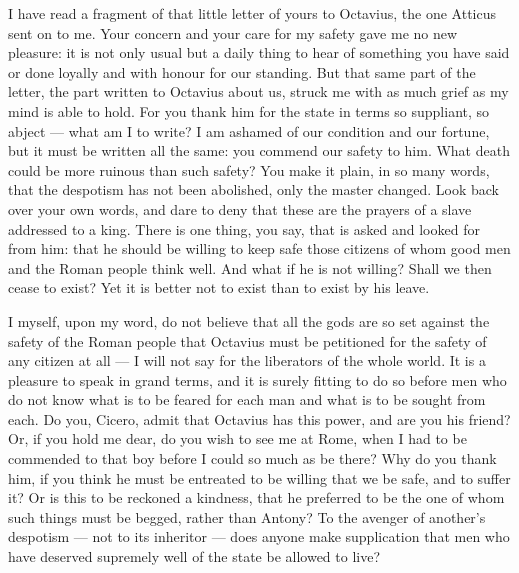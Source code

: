 

 I have read a fragment of that little letter of yours to Octavius, the one Atticus sent on to me. Your concern and your care for my safety gave me no new pleasure: it is not only usual but a daily thing to hear of something you have said or done loyally and with honour for our standing. But that same part of the letter, the part written to Octavius about us, struck me with as much grief as my mind is able to hold. For you thank him for the state in terms so suppliant, so abject --- what am I to write? I am ashamed of our condition and our fortune, but it must be written all the same: you commend our safety to him. What death could be more ruinous than such safety? You make it plain, in so many words, that the despotism has not been abolished, only the master changed. Look back over your own words, and dare to deny that these are the prayers of a slave addressed to a king. There is one thing, you say, that is asked and looked for from him: that he should be willing to keep safe those citizens of whom good men and the Roman people think well. And what if he is not willing? Shall we then cease to exist? Yet it is better not to exist than to exist by his leave.

 I myself, upon my word, do not believe that all the gods are so set against the safety of the Roman people that Octavius must be petitioned for the safety of any citizen at all --- I will not say for the liberators of the whole world. It is a pleasure to speak in grand terms, and it is surely fitting to do so before men who do not know what is to be feared for each man and what is to be sought from each. Do you, Cicero, admit that Octavius has this power, and are you his friend? Or, if you hold me dear, do you wish to see me at Rome, when I had to be commended to that boy before I could so much as be there? Why do you thank him, if you think he must be entreated to be willing that we be safe, and to suffer it? Or is this to be reckoned a kindness, that he preferred to be the one of whom such things must be begged, rather than Antony? To the avenger of another's despotism --- not to its inheritor --- does anyone make supplication that men who have deserved supremely well of the state be allowed to live?


